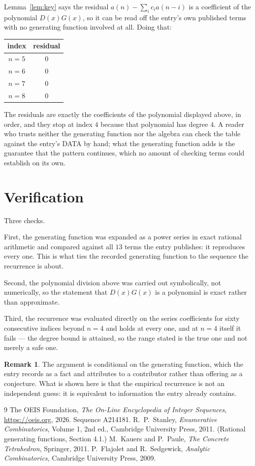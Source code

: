 \documentclass[11pt,a4paper]{article}
\theoremstyle{plain}
\theoremstyle{definition}
\newtheorem{remark}[theorem]{Remark}
\begin{document}
Lemma~\ref{lem:key} says the residual $a(n)-\sum_ic_ia(n-i)$ is a coefficient of the
polynomial $D(x)G(x)$, so it can be read off the entry's own published terms with no
generating function involved at all. Doing that:
\begin{center}
\begin{tabular}{cc}
index & residual \\ \hline
$n=5$ & $0$ \\
$n=6$ & $0$ \\
$n=7$ & $0$ \\
$n=8$ & $0$
\end{tabular}
\end{center}
The residuals are exactly the coefficients of the polynomial displayed above, in order, and
they stop at index $4$ because that polynomial has degree $4$. A reader who trusts
neither the generating function nor the algebra can check the table against the entry's DATA
by hand; what the generating function adds is the guarantee that the pattern continues, which
no amount of checking terms could establish on its own.

\section{Verification}

Three checks.

First, the generating function was expanded as a power series in exact rational arithmetic and
compared against all $13$ terms the entry publishes: it reproduces every one. This is
what ties the recorded generating function to the sequence the recurrence is about.

Second, the polynomial division above was carried out symbolically, not numerically, so the
statement that $D(x)G(x)$ is a polynomial is exact rather than approximate.

Third, the recurrence was evaluated directly on the series coefficients for sixty consecutive
indices beyond $n=4$ and holds at every one, and at $n=4$ itself it fails --- the
degree bound is attained, so the range stated is the true one and not merely a safe one.

\begin{remark}
The argument is conditional on the generating function, which the entry records as a fact and
attributes to a contributor rather than offering as a conjecture. What is shown here is that
the empirical recurrence is not an independent guess: it is equivalent to information the
entry already contains.
\end{remark}

\begin{thebibliography}{9}
 The OEIS Foundation, \emph{The On-Line Encyclopedia of Integer
Sequences}, \url{https://oeis.org}, 2026. Sequence A214181.
 R.~P.~Stanley, \emph{Enumerative Combinatorics}, Volume 1, 2nd ed.,
Cambridge University Press, 2011. (Rational generating functions, Section 4.1.)
 M.~Kauers and P.~Paule, \emph{The Concrete Tetrahedron}, Springer, 2011.
 P.~Flajolet and R.~Sedgewick, \emph{Analytic Combinatorics}, Cambridge
University Press, 2009.
\end{thebibliography}
\end{document}
